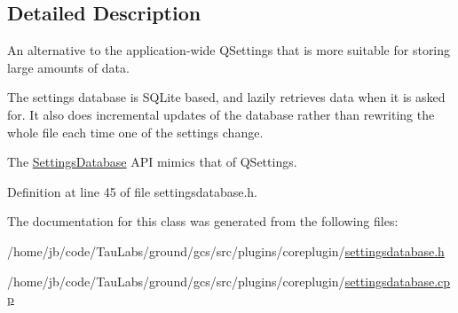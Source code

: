 \subsection{\-Detailed \-Description}
\-An alternative to the application-\/wide \-Q\-Settings that is more suitable for storing large amounts of data. 

\-The settings database is \-S\-Q\-Lite based, and lazily retrieves data when it is asked for. \-It also does incremental updates of the database rather than rewriting the whole file each time one of the settings change.

\-The \hyperlink{class_core_1_1_settings_database}{\-Settings\-Database} \-A\-P\-I mimics that of \-Q\-Settings. 

\-Definition at line 45 of file settingsdatabase.\-h.



\-The documentation for this class was generated from the following files\-:\begin{DoxyCompactItemize}
\item 
/home/jb/code/\-Tau\-Labs/ground/gcs/src/plugins/coreplugin/\hyperlink{settingsdatabase_8h}{settingsdatabase.\-h}\item 
/home/jb/code/\-Tau\-Labs/ground/gcs/src/plugins/coreplugin/\hyperlink{settingsdatabase_8cpp}{settingsdatabase.\-cpp}\end{DoxyCompactItemize}

